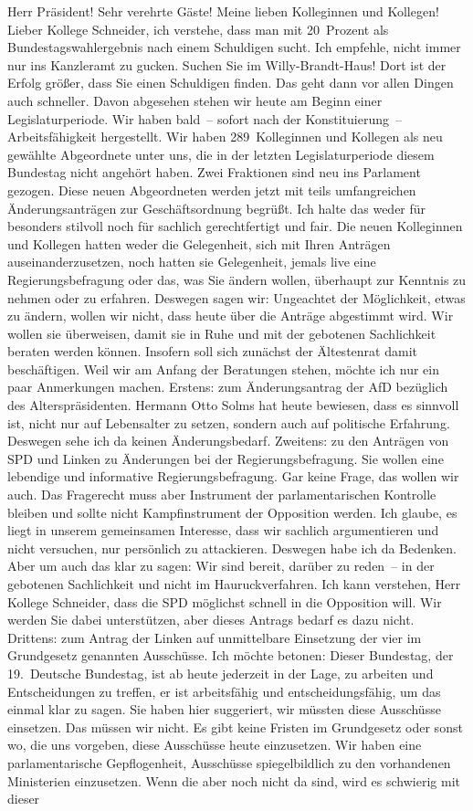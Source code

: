 \documentclass[10pt, a4paper]{report}
\begin{document}
Herr Präsident! Sehr verehrte Gäste! Meine lieben Kolleginnen und Kollegen! Lieber Kollege Schneider, ich verstehe, dass man mit 20 Prozent als Bundestagswahlergebnis nach einem Schuldigen sucht. Ich empfehle, nicht immer nur ins Kanzleramt zu gucken. Suchen Sie im Willy-Brandt-Haus! Dort ist der Erfolg größer, dass Sie einen Schuldigen finden. Das geht dann vor allen Dingen auch schneller. Davon abgesehen stehen wir heute am Beginn einer Legislaturperiode. Wir haben bald – sofort nach der Konstituierung – Arbeitsfähigkeit hergestellt. Wir haben 289 Kolleginnen und Kollegen als neu gewählte Abgeordnete unter uns, die in der letzten Legislaturperiode diesem Bundestag nicht angehört haben. Zwei Fraktionen sind neu ins Parlament gezogen. Diese neuen Abgeordneten werden jetzt mit teils umfangreichen Änderungsanträgen zur Geschäftsordnung begrüßt. Ich halte das weder für besonders stilvoll noch für sachlich gerechtfertigt und fair. Die neuen Kolleginnen und Kollegen hatten weder die Gelegenheit, sich mit Ihren Anträgen auseinanderzusetzen, noch hatten sie Gelegenheit, jemals live eine Regierungsbefragung oder das, was Sie ändern wollen, überhaupt zur Kenntnis zu nehmen oder zu erfahren. Deswegen sagen wir: Ungeachtet der Möglichkeit, etwas zu ändern, wollen wir nicht, dass heute über die Anträge abgestimmt wird. Wir wollen sie überweisen, damit sie in Ruhe und mit der gebotenen Sachlichkeit beraten werden können. Insofern soll sich zunächst der Ältestenrat damit beschäftigen. Weil wir am Anfang der Beratungen stehen, möchte ich nur ein paar Anmerkungen machen. Erstens: zum Änderungsantrag der AfD bezüglich des Alterspräsidenten. Hermann Otto Solms hat heute bewiesen, dass es sinnvoll ist, nicht nur auf Lebensalter zu setzen, sondern auch auf politische Erfahrung. Deswegen sehe ich da keinen Änderungsbedarf. Zweitens: zu den Anträgen von SPD und Linken zu Änderungen bei der Regierungsbefragung. Sie wollen eine lebendige und informative Regierungsbefragung. Gar keine Frage, das wollen wir auch. Das Fragerecht muss aber Instrument der parlamentarischen Kontrolle bleiben und sollte nicht Kampfinstrument der Opposition werden. Ich glaube, es liegt in unserem gemeinsamen Interesse, dass wir sachlich argumentieren und nicht versuchen, nur persönlich zu attackieren. Deswegen habe ich da Bedenken. Aber um auch das klar zu sagen: Wir sind bereit, darüber zu reden – in der gebotenen Sachlichkeit und nicht im Hauruckverfahren. Ich kann verstehen, Herr Kollege Schneider, dass die SPD möglichst schnell in die Opposition will. Wir werden Sie dabei unterstützen, aber dieses Antrags bedarf es dazu nicht. Drittens: zum Antrag der Linken auf unmittelbare Einsetzung der vier im Grundgesetz genannten Ausschüsse. Ich möchte betonen: Dieser Bundestag, der 19. Deutsche Bundestag, ist ab heute jederzeit in der Lage, zu arbeiten und Entscheidungen zu treffen, er ist arbeitsfähig und entscheidungsfähig, um das einmal klar zu sagen. Sie haben hier suggeriert, wir müssten diese Ausschüsse einsetzen. Das müssen wir nicht. Es gibt keine Fristen im Grundgesetz oder sonst wo, die uns vorgeben, diese Ausschüsse heute einzusetzen. Wir haben eine parlamentarische Gepflogenheit, Ausschüsse spiegelbildlich zu den vorhandenen Ministerien einzusetzen. Wenn die aber noch nicht da sind, wird es schwierig mit dieser 
\end{document}
